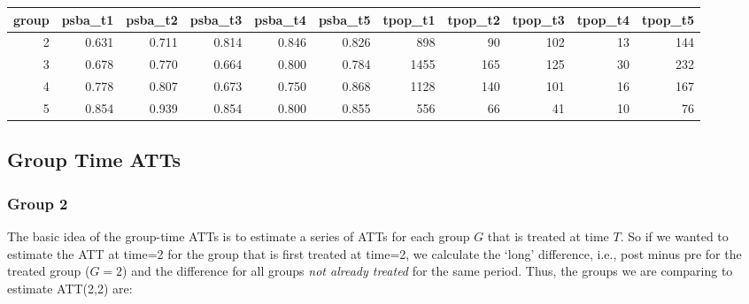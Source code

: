 \documentclass[
]{article}
\begin{document}
\begin{table}
\centering
\begin{tabular}[t]{r|r|r|r|r|r|r|r|r|r|r}
\hline
group & psba_t1 & psba_t2 & psba_t3 & psba_t4 & psba_t5 & tpop_t1 & tpop_t2 & tpop_t3 & tpop_t4 & tpop_t5\\
\hline
2 & 0.631 & 0.711 & 0.814 & 0.846 & 0.826 & 898 & 90 & 102 & 13 & 144\\
\hline
3 & 0.678 & 0.770 & 0.664 & 0.800 & 0.784 & 1455 & 165 & 125 & 30 & 232\\
\hline
4 & 0.778 & 0.807 & 0.673 & 0.750 & 0.868 & 1128 & 140 & 101 & 16 & 167\\
\hline
5 & 0.854 & 0.939 & 0.854 & 0.800 & 0.855 & 556 & 66 & 41 & 10 & 76\\
\hline
\end{tabular}
\end{table}

\hypertarget{group-time-atts}{%
\subsection{Group Time ATTs}\label{group-time-atts}}

\hypertarget{group-2}{%
\subsubsection{Group 2}\label{group-2}}

The basic idea of the group-time ATTs is to estimate a series of ATTs
for each group \(G\) that is treated at time \(T\). So if we wanted to
estimate the ATT at time=2 for the group that is first treated at
time=2, we calculate the `long' difference, i.e., post minus pre for the
treated group (\(G=2\)) and the difference for all groups \emph{not
already treated} for the same period. Thus, the groups we are comparing
to estimate ATT(2,2) are:
\end{document}
